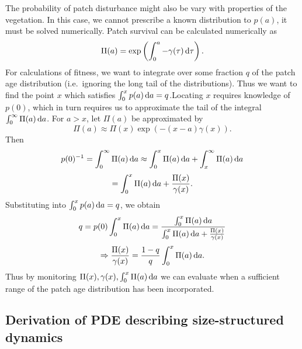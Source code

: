 \documentclass[10pt,twoside]{article}
\begin{document}
The probability of patch disturbance might also be vary with properties
of the vegetation. In this case, we cannot prescribe a known
distribution to \(p(a)\), it must be solved numerically. Patch survival
can be calculated numerically as
\[\Pi(a) = \exp \left( \int_{0}^{a}-\gamma(\tau)\,{\rm d}\tau\right).\]
For calculations of fitness, we want to integrate over some fraction
\(q\) of the patch age distribution (i.e.~ignoring the long tail of the
distributions). Thus we want to find the point \(x\) which satisfies
\(\int_{0}^{x} p(a)\,{\rm d}a =q\).Locating \(x\) requires knowledge of
\(p(0)\), which in turn requires us to approximate the tail of the
integral \(\int_{0}^{\infty} \Pi(a)\,{\rm d}a\). For \(a > x\), let
\(\Pi(a)\) be approximated by
\[\Pi(a) \approx \Pi(x) \exp\left( - (x-a) \gamma(x)\right).\] Then
\[p(0)^{-1} =\int_{0}^{\infty} \Pi(a)\,{\rm d}a \approx \int_{0}^{x} \Pi(a)\,{\rm d}a + \int_{x}^{\infty } \Pi(a)\,{\rm d}a\]
\[ = \int_{0}^{x} \Pi(a)\,{\rm d}a + \frac{\Pi(x)}{\gamma(x)}. \]
Substituting into \(\int_{0}^{x} p(a)\,{\rm d}a =q\), we obtain
\[q=  p(0) \int_{0}^{x} \Pi(a) \, {\rm d}a = \frac{\int_{0}^{x} \Pi(a) \, {\rm d}a}{\int_{0}^{x} \Pi(a)\,{\rm d}a + \frac{\Pi(x)}{\gamma(x)}}\]
\[\Rightarrow  \frac{\Pi(x)}{\gamma(x)} = \frac{1-q}{q} \int_{0}^{x} \Pi(a) \, {\rm d}a.\]
Thus by monitoring
\(\Pi(x), \gamma(x), \int_{0}^{x} \Pi(a) \, {\rm d}a\) we can evaluate
when a sufficient range of the patch age distribution has been
incorporated.

\subsection{Derivation of PDE describing size-structured
dynamics}\label{derivation-of-pde-describing-size-structured-dynamics}
\end{document}
